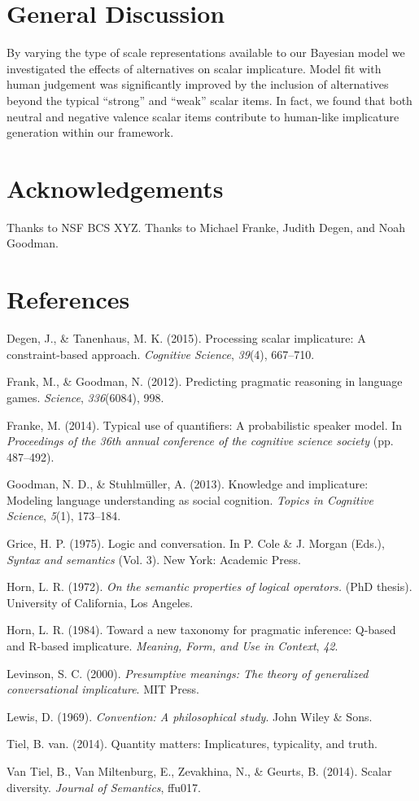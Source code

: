 \documentclass[10pt, letterpaper]{article}
\begin{document}
\section{General Discussion}\label{general-discussion}

By varying the type of scale representations available to our Bayesian
model we investigated the effects of alternatives on scalar implicature.
Model fit with human judgement was significantly improved by the
inclusion of alternatives beyond the typical ``strong'' and ``weak''
scalar items. In fact, we found that both neutral and negative valence
scalar items contribute to human-like implicature generation within our
framework.

\section{Acknowledgements}\label{acknowledgements}

Thanks to NSF BCS XYZ. Thanks to Michael Franke, Judith Degen, and Noah
Goodman.

\section{References}\label{references}

\setlength{\parindent}{-0.1in} \setlength{\leftskip}{0.125in} \noindent

Degen, J., \& Tanenhaus, M. K. (2015). Processing scalar implicature: A
constraint-based approach. \emph{Cognitive Science}, \emph{39}(4),
667--710.

Frank, M., \& Goodman, N. (2012). Predicting pragmatic reasoning in
language games. \emph{Science}, \emph{336}(6084), 998.

Franke, M. (2014). Typical use of quantifiers: A probabilistic speaker
model. In \emph{Proceedings of the 36th annual conference of the
cognitive science society} (pp. 487--492).

Goodman, N. D., \& Stuhlm{ü}ller, A. (2013). Knowledge and implicature:
Modeling language understanding as social cognition. \emph{Topics in
Cognitive Science}, \emph{5}(1), 173--184.

Grice, H. P. (1975). Logic and conversation. In P. Cole \& J. Morgan
(Eds.), \emph{Syntax and semantics} (Vol. 3). New York: Academic Press.

Horn, L. R. (1972). \emph{On the semantic properties of logical
operators.} (PhD thesis). University of California, Los Angeles.

Horn, L. R. (1984). Toward a new taxonomy for pragmatic inference:
Q-based and R-based implicature. \emph{Meaning, Form, and Use in
Context}, \emph{42}.

Levinson, S. C. (2000). \emph{Presumptive meanings: The theory of
generalized conversational implicature}. MIT Press.

Lewis, D. (1969). \emph{Convention: A philosophical study}. John Wiley
\& Sons.

Tiel, B. van. (2014). Quantity matters: Implicatures, typicality, and
truth.

Van Tiel, B., Van Miltenburg, E., Zevakhina, N., \& Geurts, B. (2014).
Scalar diversity. \emph{Journal of Semantics}, ffu017.
\end{document}
